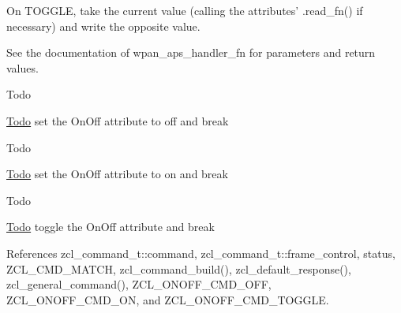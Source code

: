 On T\-O\-G\-G\-L\-E, take the current value (calling the attributes' .read\-\_\-fn() if necessary) and write the opposite value.

See the documentation of wpan\-\_\-aps\-\_\-handler\-\_\-fn for parameters and return values. \begin{DoxyRefDesc}{Todo}
\item[\hyperlink{todo__todo000018}{Todo}]set the On\-Off attribute to off and break \end{DoxyRefDesc}


\begin{DoxyRefDesc}{Todo}
\item[\hyperlink{todo__todo000019}{Todo}]set the On\-Off attribute to on and break \end{DoxyRefDesc}


\begin{DoxyRefDesc}{Todo}
\item[\hyperlink{todo__todo000020}{Todo}]toggle the On\-Off attribute and break \end{DoxyRefDesc}


References zcl\-\_\-command\-\_\-t\-::command, zcl\-\_\-command\-\_\-t\-::frame\-\_\-control, status, Z\-C\-L\-\_\-\-C\-M\-D\-\_\-\-M\-A\-T\-C\-H, zcl\-\_\-command\-\_\-build(), zcl\-\_\-default\-\_\-response(), zcl\-\_\-general\-\_\-command(), Z\-C\-L\-\_\-\-O\-N\-O\-F\-F\-\_\-\-C\-M\-D\-\_\-\-O\-F\-F, Z\-C\-L\-\_\-\-O\-N\-O\-F\-F\-\_\-\-C\-M\-D\-\_\-\-O\-N, and Z\-C\-L\-\_\-\-O\-N\-O\-F\-F\-\_\-\-C\-M\-D\-\_\-\-T\-O\-G\-G\-L\-E.

